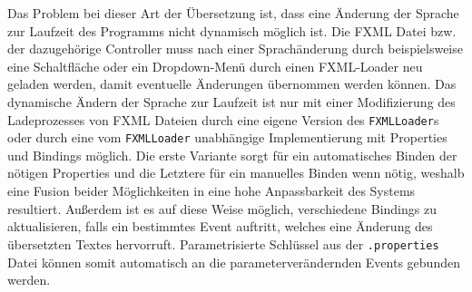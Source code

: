 \noindent Das Problem bei dieser Art der Übersetzung ist, dass eine Änderung der Sprache zur Laufzeit des Programms nicht dynamisch möglich ist. Die FXML Datei bzw. der dazugehörige Controller muss nach einer Sprachänderung durch beispielsweise eine Schaltfläche oder ein Dropdown-Menü durch einen FXML-Loader neu geladen werden, damit eventuelle Änderungen übernommen werden können. Das dynamische Ändern der Sprache zur Laufzeit ist nur mit einer Modifizierung des Ladeprozesses von FXML Dateien durch eine eigene Version des \texttt{FXMLLoader}s oder durch eine vom \texttt{FXMLLoader} unabhängige Implementierung mit Properties und Bindings möglich. Die erste Variante sorgt für ein automatisches Binden der nötigen Properties und die Letztere für ein manuelles Binden wenn nötig, weshalb eine Fusion beider Möglichkeiten in eine hohe Anpassbarkeit des Systems resultiert. Außerdem ist es auf diese Weise möglich, verschiedene Bindings zu aktualisieren, falls ein bestimmtes Event auftritt, welches eine Änderung des übersetzten Textes hervorruft. Parametrisierte Schlüssel aus der \texttt{.properties} Datei können somit automatisch an die parameterverändernden Events gebunden werden.
